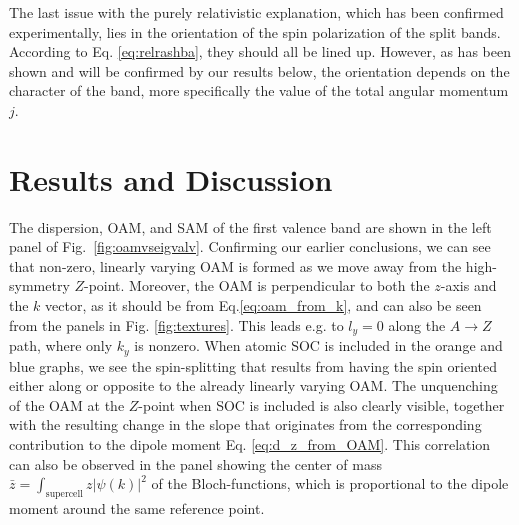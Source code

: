 The last issue with the purely relativistic explanation, which has been confirmed experimentally\cite{Krempasky2015SurfaceSemiconductor}, lies in the orientation of the spin polarization of the split bands. According to Eq. \ref{eq:relrashba}, they should all be lined up. However, as has been shown and will be confirmed by our results below, the orientation depends on the character of the band, more specifically the value of the total angular momentum $j$. 

\section{Results and Discussion}
The dispersion, OAM, and SAM of the first valence band are shown in the left panel of Fig.~\ref{fig:oamvseigvalv}. Confirming our earlier conclusions, we can see that non-zero, linearly varying OAM is formed as we move away from the high-symmetry $Z$-point. Moreover, the OAM is perpendicular to both the $z$-axis and the $k$ vector, as it should be from Eq.\ref{eq:oam_from_k}, and can also be seen from the panels in Fig. \ref{fig:textures}. This leads e.g. to $l_y=0$ along the $A \to Z$ path, where only $k_y$ is nonzero. When atomic SOC is included in the orange and blue graphs, we see the spin-splitting that results from having the spin oriented either along or opposite to the already linearly varying OAM. The unquenching of the OAM at the $Z$-point when SOC is included is also clearly visible, together with the resulting change in the slope that originates from the corresponding contribution to the dipole moment Eq. \ref{eq:d_z_from_OAM}. This correlation can also be observed in the panel showing the center of mass $\bar{z}=\int_{\textrm{supercell}}z |\psi(k)|^2$ of the Bloch-functions, which is proportional to the dipole moment around the same reference point.

